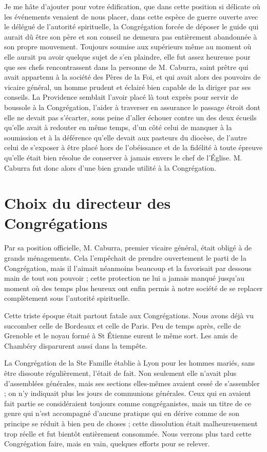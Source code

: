 Je me hâte d'ajouter pour votre édification, que dans cette position si délicate où les événements venaient de nous placer, dans cette espèce de guerre ouverte avec le délégué de l'autorité spirituelle, la Congrégation forcée de déposer le guide qui aurait dû être son père et son conseil ne demeura pas entièrement abandonnée à son propre mouvement. Toujours soumise aux supérieurs même au moment où elle aurait pu avoir quelque sujet de s'en plaindre, elle fut assez heureuse pour que ses chefs rencontrassent dans la personne de M. Caburra, saint prêtre qui avait appartenu à la société des Pères de la Foi, et qui avait alors des pouvoirs de vicaire général, un homme prudent et éclairé bien capable
de la diriger par ses conseils. La Providence semblait l'avoir placé là tout exprès pour servir de boussole à la Congrégation, l'aider à traverser en assurance le passage étroit dont elle ne devait pas s'écarter, sous peine d'aller échouer contre un des deux écueils qu'elle avait à redouter en même temps, d'un côté celui de manquer à la soumission et à la déférence qu'elle devait aux pasteurs du diocèse, de l'autre celui de s'exposer à être placé hors de l'obéissance et de la fidélité à toute épreuve qu'elle était bien résolue de conserver à jamais envers le chef de l'Église. M. Caburra fut donc alors d'une bien grande utilité à la Congrégation.

\section*{Choix du directeur des Congrégations}
Par sa position officielle, M. Caburra, premier vicaire général, était obligé à de grands ménagements. Cela l'empêchait de prendre ouvertement le parti de la Congrégation, mais il l'aimait néanmoins beaucoup et la favorisait par dessous main de tout son pouvoir ; cette protection ne lui a jamais manqué jusqu'au moment où des temps plus heureux ont enfin permis à notre société de se replacer complètement sous l'autorité spirituelle.

Cette triste époque était partout fatale aux Congrégations. Nous avons déjà vu succomber celle de Bordeaux et celle de Paris. Peu de temps après, celle de Grenoble et le noyau formé à St Étienne eurent le même sort. Les amis de Chambéry disparurent aussi dans la tempête.

La Congrégation de la Ste Famille établie à Lyon pour les hommes mariés, sans être dissoute régulièrement, l'était de fait. Non seulement elle n'avait plus d'assemblées générales, mais ses sections elles-mêmes avaient cessé de s'assembler ; on n'y indiquait plus les jours de communions générales. Ceux qui en avaient fait partie se considéraient
toujours comme congréganistes, mais un titre de ce genre qui n'est accompagné d'aucune pratique qui en dérive comme de son principe se réduit à bien peu de choses ; cette dissolution était malheureusement trop réelle et fut bientôt entièrement consommée. Nous verrons plus tard cette Congrégation faire, mais en vain, quelques efforts pour se relever.

